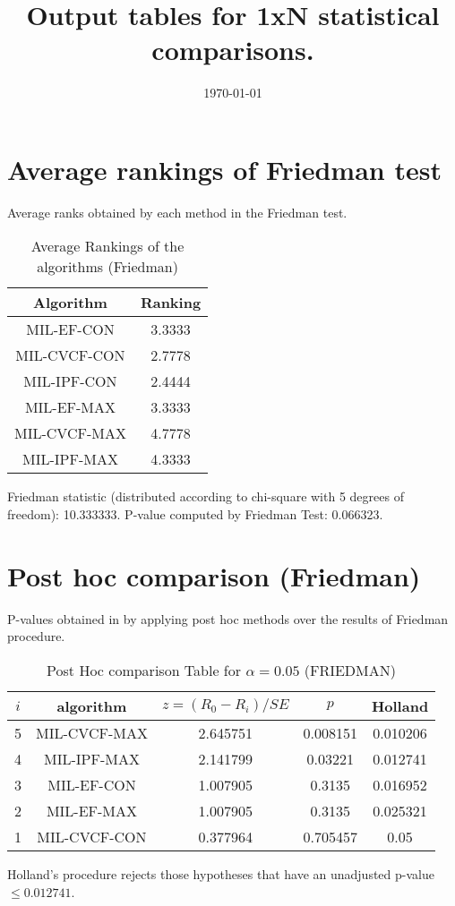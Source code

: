 \documentclass[a4paper,10pt]{article}
\title{Output tables for 1xN statistical comparisons.}
\author{}
\date{\today}
\begin{document}
\begin{landscape}
\pagestyle{empty}
\maketitle
\thispagestyle{empty}

\section{Average rankings of Friedman test}


Average ranks obtained by each method in the Friedman test.

\begin{table}[!htp]
\centering
\begin{tabular}{|c|c|}\hline
Algorithm&Ranking\\\hline
MIL-EF-CON&3.3333\\MIL-CVCF-CON&2.7778\\MIL-IPF-CON&2.4444\\MIL-EF-MAX&3.3333\\MIL-CVCF-MAX&4.7778\\MIL-IPF-MAX&4.3333\\\hline\end{tabular}
\caption{Average Rankings of the algorithms (Friedman)}
\end{table}

Friedman statistic (distributed according to chi-square with 5 degrees of freedom): 10.333333. \newline P-value computed by Friedman Test: 0.066323.\newline


\newpage

\section{Post hoc comparison (Friedman)}


P-values obtained in by applying post hoc methods over the results of Friedman procedure.

\begin{table}[!htp]
\centering\footnotesize
\begin{tabular}{ccccc}
$i$&algorithm&$z=(R_0 - R_i)/SE$&$p$&Holland\\
\hline5&MIL-CVCF-MAX&2.645751&0.008151&0.010206\\4&MIL-IPF-MAX&2.141799&0.03221&0.012741\\3&MIL-EF-CON&1.007905&0.3135&0.016952\\2&MIL-EF-MAX&1.007905&0.3135&0.025321\\1&MIL-CVCF-CON&0.377964&0.705457&0.05\\\hline
\end{tabular}
\caption{Post Hoc comparison Table for $\alpha=0.05$ (FRIEDMAN)}
\end{table}Holland's procedure rejects those hypotheses that have an unadjusted p-value $\le0.012741$.



\end{landscape}
\end{document}

